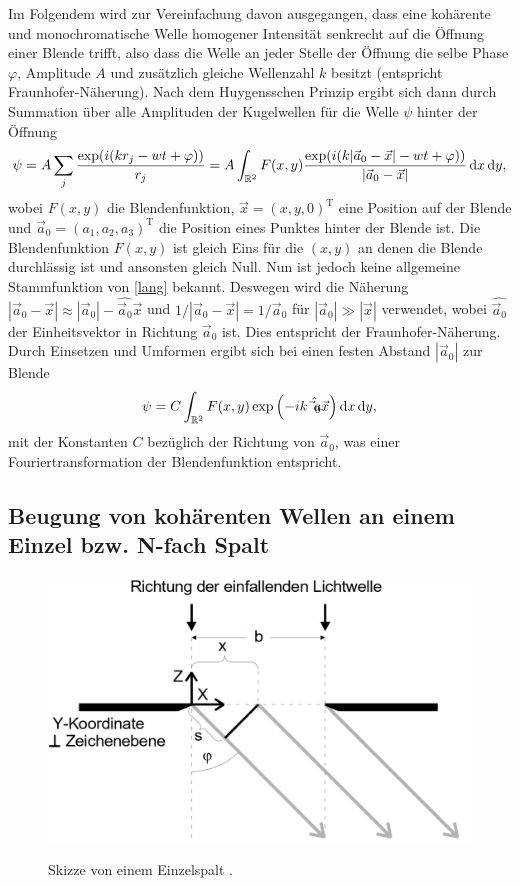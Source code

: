 Im Folgendem wird zur Vereinfachung davon ausgegangen, dass eine kohärente und monochromatische Welle homogener Intensität senkrecht auf die Öffnung einer Blende trifft, also dass die Welle an jeder Stelle der Öffnung die selbe Phase $\varphi$, Amplitude $A$ und zusätzlich gleiche Wellenzahl $k$ besitzt (entspricht Fraunhofer-Näherung). Nach dem Huygensschen Prinzip ergibt sich dann durch Summation über alle Amplituden der Kugelwellen für die Welle $\psi$ hinter der Öffnung
\begin{equation}
	\psi = A \sum \limits_j \frac{\exp(i (k r_j -w t+\varphi))}{r_j}= A \int_{\mathbb{R}^2} F(x, y) \frac{\exp(i (k |\vec{a}_0-\vec{x}| -w t+\varphi))}{|\vec{a}_0-\vec{x}|} \mathop{}\!\mathrm{d} x \mathop{}\!\mathrm{d} y,\label{lang}
\end{equation}
wobei $F(x, y)$ die Blendenfunktion, $\vec{x}=(x,y,0)^\text{T}$ eine Position auf der Blende und $\vec{a}_0=(a_1,a_2,a_3)^\text{T}$ die Position eines Punktes hinter der Blende ist.
Die Blendenfunktion $F(x,y)$ ist gleich Eins für die $(x, y)$ an denen die Blende durchlässig ist und ansonsten gleich Null. Nun ist jedoch keine allgemeine Stammfunktion von \eqref{lang} bekannt. Deswegen wird die Näherung $|\vec{a}_0-\vec{x}| \approx |\vec{a}_0|- \hat{\vec{a}_0} \vec{x}$ und $1/|\vec{a}_0-\vec{x}|=1/\vec{a}_0 $ für $|\vec{a}_0|\gg |\vec{x}|$ verwendet, wobei $\hat{\vec{a}_0}$ der Einheitsvektor in Richtung $\vec{a}_0$ ist. Dies entspricht der Fraunhofer-Näherung. Durch Einsetzen und Umformen ergibt sich bei einen festen Abstand $|\vec{a}_0|$ zur Blende
\begin{equation}
	\psi = C \int_{\mathbb{R}^2} F(x,y) \exp\left(-i k \hat{\vec{a}_0} \vec{x}\right) \mathop{}\!\mathrm{d} x \mathop{}\!\mathrm{d} y, \label{eq:Integral}
\end{equation}
mit der Konstanten $C$ bezüglich der Richtung von $\vec{a}_0$, was einer Fouriertransformation der Blendenfunktion entspricht.

\subsection{Beugung von kohärenten Wellen an einem Einzel bzw. N-fach Spalt}
\begin{figure}
	\centering
	\caption{Skizze von einem Einzelspalt \cite{V406}.}
	\includegraphics[width=\linewidth-150pt,height=\textheight-150pt,keepaspectratio]{content/images/Einzelspalt.png}
	\label{fig:Einzel}
\end{figure}

